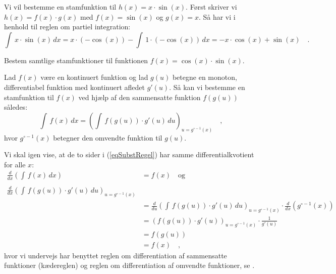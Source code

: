 \begin{example} \label{exampPartielInt}
Vi vil bestemme en stamfunktion til $h(x) = x\cdot \sin(x)$. Først skriver vi $h(x) = f(x)\cdot g(x)$ med $f(x)= \sin(x)$ og $g(x) = x$. Så har vi i henhold til reglen om partiel integration:
\begin{equation}
\int\,x\cdot \sin(x) \, dx = x\cdot (-\cos(x)) - \int\, 1 \cdot (-\cos(x))\, dx = - x\cdot \cos(x) + \sin(x) \quad .
\end{equation}
\end{example}

\begin{exercise} \label{exercCosSin}
Bestem samtlige stamfunktioner til funktionen $f(x) = \cos(x)\cdot \sin(x)$.
\end{exercise}


\begin{theorem}\label{thmSubstitutInt}
Lad $f(x)$ være en kontinuert funktion og lad $g(u)$ betegne en monoton, differentiabel funktion med kontinuert afledet $g'(u)$. Så  kan vi bestemme en stamfunktion til $f(x)$ ved hjælp af den sammensatte funktion $f(g(u))$ således:
\begin{equation}\label{eqSubstRegel}
\int\,f(x) \, dx = \left( \int \, f(g(u))\cdot g'(u) \, du \right)_{u = g^{\circ - 1}(x)} \quad ,
\end{equation}
hvor $g^{\circ - 1}(x)$ betegner den omvendte funktion til $g(u)$.
\end{theorem}
\begin{bevis}
Vi skal igen vise, at de to sider i (\ref{eqSubstRegel}) har samme differentialkvotient for alle $x$:
\begin{equation}
\begin{aligned}
\frac{d}{dx}\left( \int\,f(x) \, dx \right) &= f(x) \quad  \textrm{og} \\ \\
\frac{d}{dx}\left(\int \, f(g(u))\cdot g'(u) \, du \right)_{u = g^{\circ - 1}(x)} \\
&= \frac{d}{du}\left(\int \, f(g(u))\cdot g'(u) \, du \right)_{u = g^{\circ - 1}(x)} \cdot \frac{d}{dx}\left( g^{\circ - 1}(x)\right) \\
&= \left( f(g(u))\cdot g'(u)\right)_{u = g^{\circ - 1}(x)} \cdot \frac{1}{g'(u)} \\
&= f(g(u)) \\
&= f(x) \quad ,
\end{aligned}
\end{equation}
hvor vi undervejs har benyttet reglen om differentiation af sammensatte funktioner (kædereg\-len) og reglen om differentiation af omvendte funktioner, se .
\end{bevis}

